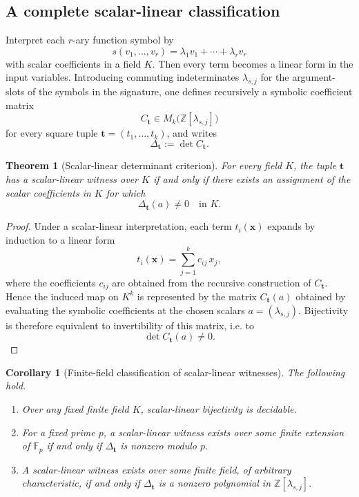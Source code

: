 \documentclass[11pt]{article}
\theoremstyle{definition}
\theoremstyle{plain}
\newtheorem{theorem}[definition]{Theorem}
\newtheorem{corollary}[definition]{Corollary}
\begin{document}
\subsection{A complete scalar-linear classification}
\label{subsec:linear-decidable}
Interpret each $r$-ary function symbol by
\[
s(v_1,\dots,v_r)=\lambda_1v_1+\cdots+\lambda_rv_r
\]
with scalar coefficients in a field $K$.
Then every term becomes a linear form in the input variables.
Introducing commuting indeterminates $\lambda_{s,j}$ for the argument-slots of the symbols in the signature, one
defines recursively a symbolic coefficient matrix
\[
C_{\mathbf t}\in M_k\bigl(\mathbb Z[\lambda_{s,j}]\bigr)
\]
for every square tuple $\mathbf t=(t_1,\dots,t_k)$, and writes
\[
\Delta_{\mathbf t}:=\det C_{\mathbf t}.
\]

\begin{theorem}[Scalar-linear determinant criterion]
\label{prop:scalar-det-criterion-main}
For every field $K$, the tuple $\mathbf t$ has a scalar-linear witness over $K$ if and only if there exists an
assignment of the scalar coefficients in $K$ for which
\[
\Delta_{\mathbf t}(a)\neq 0\quad\text{in }K.
\]
\end{theorem}

\begin{proof}
Under a scalar-linear interpretation, each term $t_i(\mathbf x)$ expands by induction to a linear form
\[
t_i(\mathbf x)=\sum_{j=1}^k c_{ij}\,x_j,
\]
where the coefficients $c_{ij}$ are obtained from the recursive construction of $C_{\mathbf t}$.
Hence the induced map on $K^k$ is represented by the matrix $C_{\mathbf t}(a)$ obtained by evaluating the symbolic
coefficients at the chosen scalars $a=(\lambda_{s,j})$.
Bijectivity is therefore equivalent to invertibility of this matrix, i.e. to
\[
\det C_{\mathbf t}(a)\neq 0.
\]
\end{proof}

\begin{corollary}[Finite-field classification of scalar-linear witnesses]
\label{cor:scalar-linear-classification}
The following hold.
\begin{enumerate}[label=\textit{(\alph*)}, leftmargin=*]
\item Over any fixed finite field $K$, scalar-linear bijectivity is decidable.
\item For a fixed prime $p$, a scalar-linear witness exists over some finite extension of $\mathbb F_p$ if and
      only if $\Delta_{\mathbf t}$ is nonzero modulo $p$.
\item A scalar-linear witness exists over some finite field, of arbitrary characteristic, if and only if
      $\Delta_{\mathbf t}$ is a nonzero polynomial in $\mathbb Z[\lambda_{s,j}]$.
\end{enumerate}
\end{corollary}
\end{document}
